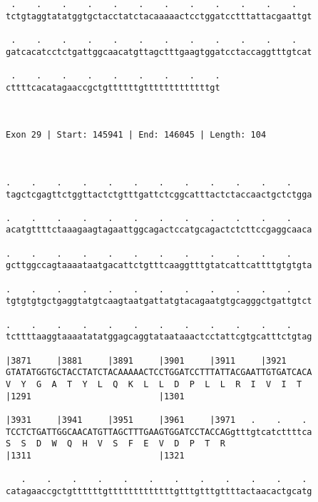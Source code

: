 \documentclass{article}
\begin{document}
\begin{Verbatim}
 .    .    .    .    .    .    .    .    .    .    .    .   
tctgtaggtatatggtgctacctatctacaaaaactcctggatcctttattacgaattgt
                                                            
 .    .    .    .    .    .    .    .    .    .    .    .   
gatcacatcctctgattggcaacatgttagctttgaagtggatcctaccaggtttgtcat
                                                            
 .    .    .    .    .    .    .    .    .
cttttcacatagaaccgctgttttttgtttttttttttttgt
                                          
                                          
 
Exon 29 | Start: 145941 | End: 146045 | Length: 104



.    .    .    .    .    .    .    .    .    .    .    .    
tagctcgagttctggttactctgtttgattctcggcatttactctaccaactgctctgga
                                                            
.    .    .    .    .    .    .    .    .    .    .    .    
acatgttttctaaagaagtagaattggcagactccatgcagactctcttccgaggcaaca
                                                            
.    .    .    .    .    .    .    .    .    .    .    .    
gcttggccagtaaaataatgacattctgtttcaaggtttgtatcattcattttgtgtgta
                                                            
.    .    .    .    .    .    .    .    .    .    .    .    
tgtgtgtgctgaggtatgtcaagtaatgattatgtacagaatgtgcagggctgattgtct
                                                            
.    .    .    .    .    .    .    .    .    .    .    .    
tcttttaaggtaaaatatatggagcaggtataataaactcctattcgtgcatttctgtag
                                                            
|3871     |3881     |3891     |3901     |3911     |3921     
GTATATGGTGCTACCTATCTACAAAAACTCCTGGATCCTTTATTACGAATTGTGATCACA
V  Y  G  A  T  Y  L  Q  K  L  L  D  P  L  L  R  I  V  I  T  
|1291                         |1301                         
  
|3931     |3941     |3951     |3961     |3971   .    .    . 
TCCTCTGATTGGCAACATGTTAGCTTTGAAGTGGATCCTACCAGgtttgtcatcttttca
S  S  D  W  Q  H  V  S  F  E  V  D  P  T  R                 
|1311                         |1321                         
  
   .    .    .    .    .    .    .    .    .    .    .    . 
catagaaccgctgttttttgtttttttttttttgtttgtttgttttactaacactgcatg
                                                            

\end{Verbatim}
\end{document}
